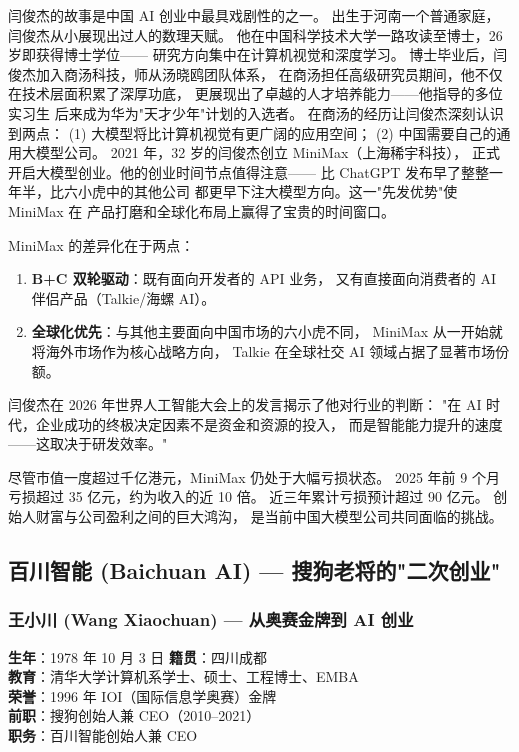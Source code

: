 闫俊杰的故事是中国 AI 创业中最具戏剧性的之一。
出生于河南一个普通家庭，闫俊杰从小展现出过人的数理天赋。
他在中国科学技术大学一路攻读至博士，26 岁即获得博士学位——
研究方向集中在计算机视觉和深度学习。
博士毕业后，闫俊杰加入商汤科技，师从汤晓鸥团队体系，
在商汤担任高级研究员期间，他不仅在技术层面积累了深厚功底，
更展现出了卓越的人才培养能力——他指导的多位实习生
后来成为华为"天才少年"计划的入选者。
在商汤的经历让闫俊杰深刻认识到两点：
(1) 大模型将比计算机视觉有更广阔的应用空间；
(2) 中国需要自己的通用大模型公司。
2021 年，32 岁的闫俊杰创立 MiniMax（上海稀宇科技），
正式开启大模型创业。他的创业时间节点值得注意——
比 ChatGPT 发布早了整整一年半，比六小虎中的其他公司
都更早下注大模型方向。这一"先发优势"使 MiniMax 在
产品打磨和全球化布局上赢得了宝贵的时间窗口。

MiniMax 的差异化在于两点：
\begin{enumerate}[noitemsep]
  \item \textbf{B+C 双轮驱动}：既有面向开发者的 API 业务，
        又有直接面向消费者的 AI 伴侣产品（Talkie/海螺 AI）。
  \item \textbf{全球化优先}：与其他主要面向中国市场的六小虎不同，
        MiniMax 从一开始就将海外市场作为核心战略方向，
        Talkie 在全球社交 AI 领域占据了显著市场份额。
\end{enumerate}

闫俊杰在 2026 年世界人工智能大会上的发言揭示了他对行业的判断：
"在 AI 时代，企业成功的终极决定因素不是资金和资源的投入，
而是智能能力提升的速度——这取决于研发效率。"

\begin{warnbox}
尽管市值一度超过千亿港元，MiniMax 仍处于大幅亏损状态。
2025 年前 9 个月亏损超过 35 亿元，约为收入的近 10 倍。
近三年累计亏损预计超过 90 亿元。
创始人财富与公司盈利之间的巨大鸿沟，
是当前中国大模型公司共同面临的挑战。
\end{warnbox}


\subsection{百川智能 (Baichuan AI) — 搜狗老将的"二次创业"}

\subsubsection{王小川 (Wang Xiaochuan) — 从奥赛金牌到 AI 创业}

\begin{keybox}
\textbf{生年}：1978 年 10 月 3 日 \quad \textbf{籍贯}：四川成都 \\
\textbf{教育}：清华大学计算机系学士、硕士、工程博士、EMBA \\
\textbf{荣誉}：1996 年 IOI（国际信息学奥赛）金牌 \\
\textbf{前职}：搜狗创始人兼 CEO（2010--2021） \\
\textbf{职务}：百川智能创始人兼 CEO
\end{keybox}

